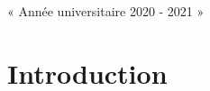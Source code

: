 \documentclass[13pt ,a4paper ]{report}
\begin{document}
\begin{titlepage}
		\begin{center}
			{\large « Année universitaire 2020 - 2021 »}
		\end{center}
		

\end{titlepage}

\newpage
\tableofcontents 
\thispagestyle{empty}                 %
\renewcommand{\thepage}{\arabic{page}}
\pagestyle{plain} 
\setcounter{page}{0}					
\newpage

\renewcommand\thesubsection{\Roman{subsection}}
\renewcommand\thesubsubsection{\Alph{subsubsection}}	
	
\section*{Introduction}
\end{document}
